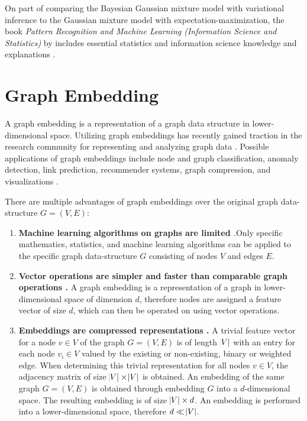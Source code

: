 \documentclass[conference]{IEEEtran}
\begin{document}
On part of comparing the Bayesian Gaussian mixture model with variational inference to the Gaussian mixture model with expectation-maximization, the \citeyear{Bishop06} book \textit{Pattern Recognition and Machine Learning (Information Science and Statistics)} by \citeauthor{Bishop06} includes essential statistics and information science knowledge and explanations \cite{Bishop06}.

\section{Graph Embedding}

A graph embedding is a representation of a graph data structure in lower-dimensional space. Utilizing graph embeddings has recently gained traction in the research community for representing and analyzing graph data \cite{Goyal_2018}. Possible applications of graph embeddings include node and graph classification, anomaly detection, link prediction, recommender systems, graph compression, and visualizations \cite{rossi20tkdd-roles}.

There are multiple advantages of graph embeddings over the original graph data-structure $G = (V, E)$:

\begin{enumerate}
    \item \textbf{Machine learning algorithms on graphs are limited \cite{Godec2018}}.Only specific mathematics, statistics, and machine learning algorithms can be applied to the specific graph data-structure $G$ consisting of nodes $V$ and edges $E$.
    \item \textbf{Vector operations are simpler and faster than comparable graph operations \cite{Godec2018}.} A graph embedding is a representation of a graph in lower-dimensional space of dimension $d$, therefore nodes are assigned a feature vector of size $d$, which can then be operated on using vector operations.
    \item \textbf{Embeddings are compressed representations \cite{Godec2018}.} A trivial feature vector for a node $v \in V$ of the graph $G = (V, E)$ is of length $\abs{V}$ with an entry for each node $v_i \in V$ valued by the existing or non-existing, binary or weighted edge. When determining this trivial representation for all nodes $v \in V$, the adjacency matrix of size $\abs{V} \times \abs{V}$ is obtained. An embedding of the same graph $G = (V, E)$ is obtained through embedding $G$ into a $d$-dimensional space. The resulting embedding is of size $\abs{V} \times d$. An embedding is performed into a lower-dimensional space, therefore $d \ll \abs{V}$.
\end{enumerate}
\end{document}
